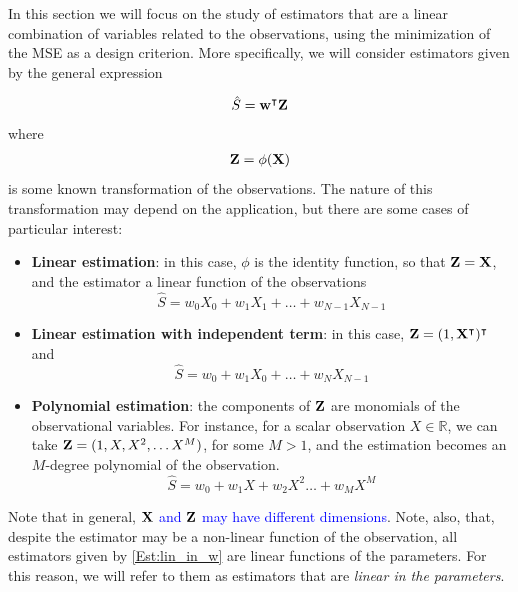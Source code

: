 In this section we will focus on the study of estimators that are a linear combination of variables related to the observations, using the minimization of the MSE as a design criterion. More specifically, we will consider estimators given by the general expression
{\begin{align}
\label{Est:lin_in_w}
\hat S = {\bf w}^\intercal {\bf Z}
\end{align}
where 
\begin{align}
{\bf Z}=\phi({\bf X})
\end{align}
is some known transformation of the observations. The nature of this transformation may depend on the application, but there are some cases of particular interest:
\begin{itemize}
\item \textbf{Linear estimation}: in this case, $\phi$ is the identity function, so that ${\bf Z}={\bf X}$, and the estimator a linear function of the observations
\begin{equation}
\hat S = w_0 X_0 + w_1 X_1 + \dots + w_{N-1} X_{N-1}
\end{equation}
\item \textbf{Linear estimation with independent term}: in this case, ${\bf Z}=(1, {\bf X}^\intercal)^\intercal$ and
\begin{equation}
\label{Est:blin}
\hat S = w_0 + w_1 X_0 + \dots + w_{N} X_{N-1}
\end{equation}
\item \textbf{Polynomial estimation}: the components of ${\bf Z}$ are monomials of the observational variables. For instance, for a scalar observation $X \in \mathbb{R}$, we can take ${\bf Z} = (1, X, X^2, \ldots X^M)$, for some $M>1$, and the estimation becomes an $M$-degree polynomial of the observation.
\begin{equation}
\hat S = w_0 + w_1 X + w_2 X^2 \dots + w_M X^M
\end{equation}
\end{itemize}}

{Note that in general, \textcolor{blue}{${\bf X}$ and ${\bf Z}$ may have different dimensions}. Note, also, that, despite the estimator may be a non-linear function of the observation, all estimators given by \eqref{Est:lin_in_w} are linear functions of the parameters. For this reason, we will refer to them as estimators that are \textit{linear in the parameters}.}


